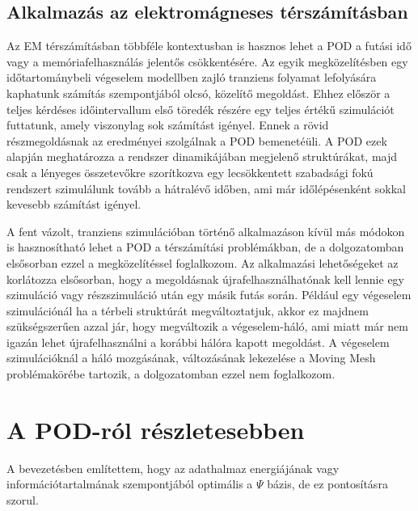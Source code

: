         \subsection{Alkalmazás az elektromágneses térszámításban}
            \label{sec:empod}
            Az EM térszámításban többféle kontextusban is hasznos lehet a POD a futási idő  vagy a memóriafelhasználás jelentős csökkentésére. Az egyik megközelítésben egy időtartománybeli végeselem modellben zajló tranziens folyamat lefolyására kaphatunk számítás szempontjából olcsó, közelítő megoldást. Ehhez először a teljes kérdéses időintervallum első töredék részére egy teljes értékű szimulációt futtatunk, amely viszonylag sok számítást igényel. Ennek a rövid részmegoldásnak az eredményei szolgálnak a POD bemenetéüli. A POD ezek alapján meghatározza a rendszer dinamikájában megjelenő struktúrákat, majd csak a lényeges összetevőkre szorítkozva egy lecsökkentett szabadsági fokú rendszert szimulálunk tovább a hátralévő időben, ami már időlépésenként sokkal kevesebb számítást igényel.
            \par
            A fent vázolt, tranziens szimulációban történő alkalmazáson kívül más módokon is hasznosítható lehet a POD a térszámítási problémákban, de a dolgozatomban elsősorban ezzel a megközelítéssel foglalkozom. Az alkalmazási lehetőségeket az korlátozza elsősorban, hogy a megoldásnak újrafelhasználhatónak kell lennie egy szimuláció vagy részszimuláció után egy másik futás során. Például egy végeselem szimulációnál ha a térbeli struktúrát megváltoztatjuk, akkor ez majdnem szükségszerűen azzal jár, hogy megváltozik a végeselem-háló, ami miatt már nem igazán lehet újrafelhasználni a korábbi hálóra kapott megoldást. A végeselem szimulációknál a háló mozgásának, változásának lekezelése a Moving Mesh problémakörébe tartozik, a dolgozatomban ezzel nem foglalkozom.
    \section{A POD-ról részletesebben}
    \label{sec:POD}
        A bevezetésben említettem, hogy az adathalmaz energiájának vagy információtartalmának szempontjából optimális a $\Psi$ bázis, de ez pontosításra szorul.
        \cite{Jolliffe16}
